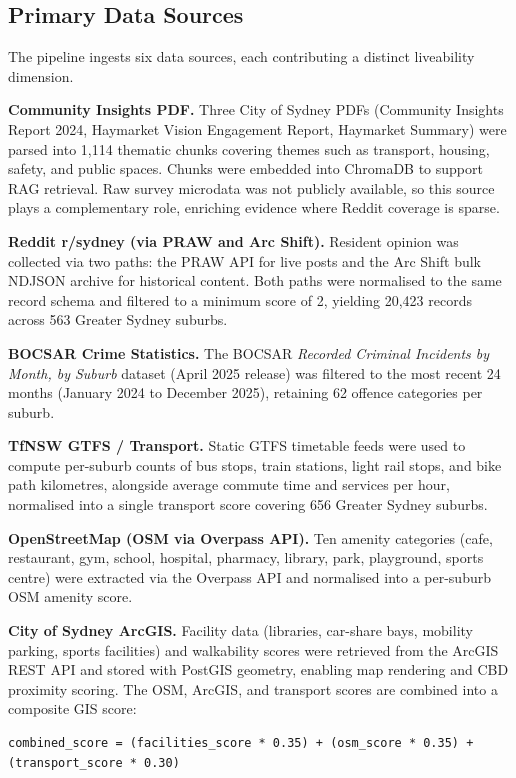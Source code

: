\documentclass[11pt,a4paper]{article}
\begin{document}
\subsection{Primary Data Sources}\label{41-primary-data-sources}

The pipeline ingests six data sources, each contributing a distinct liveability dimension.

\textbf{Community Insights PDF.} Three City of Sydney PDFs (Community Insights Report 2024, Haymarket Vision Engagement Report, Haymarket Summary) were parsed into 1,114 thematic chunks covering themes such as transport, housing, safety, and public spaces. Chunks were embedded into ChromaDB to support RAG retrieval. Raw survey microdata was not publicly available, so this source plays a complementary role, enriching evidence where Reddit coverage is sparse.

\textbf{Reddit r/sydney (via PRAW and Arc Shift).} Resident opinion was collected via two paths: the PRAW API for live posts and the Arc Shift bulk NDJSON archive for historical content. Both paths were normalised to the same record schema and filtered to a minimum score of 2, yielding 20,423 records across 563 Greater Sydney suburbs.

\textbf{BOCSAR Crime Statistics.} The BOCSAR \emph{Recorded Criminal Incidents by Month, by Suburb} dataset (April 2025 release) was filtered to the most recent 24 months (January 2024 to December 2025), retaining 62 offence categories per suburb.

\textbf{TfNSW GTFS / Transport.} Static GTFS timetable feeds were used to compute per-suburb counts of bus stops, train stations, light rail stops, and bike path kilometres, alongside average commute time and services per hour, normalised into a single transport score covering 656 Greater Sydney suburbs.

\textbf{OpenStreetMap (OSM via Overpass API).} Ten amenity categories (cafe, restaurant, gym, school, hospital, pharmacy, library, park, playground, sports centre) were extracted via the Overpass API and normalised into a per-suburb OSM amenity score.

\textbf{City of Sydney ArcGIS.} Facility data (libraries, car-share bays, mobility parking, sports facilities) and walkability scores were retrieved from the ArcGIS REST API and stored with PostGIS geometry, enabling map rendering and CBD proximity scoring. The OSM, ArcGIS, and transport scores are combined into a composite GIS score:

\begin{lstlisting}
combined_score = (facilities_score * 0.35) + (osm_score * 0.35) + (transport_score * 0.30)
\end{lstlisting}
\end{document}
